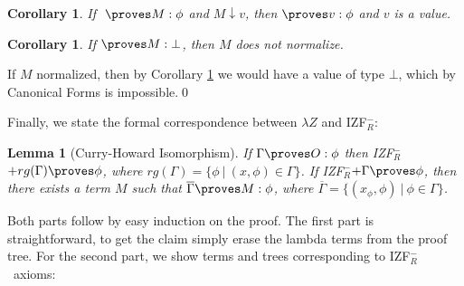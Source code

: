 \documentclass{LMCS}
\newtheorem{corollary}[thm]{Corollary}
\newtheorem{lemma}[thm]{Lemma}
\newcommand{\ov}[1]{\ensuremath{\overline{#1}}}
\newcommand{\p}{\proves}
\newcommand{\g}{\Gamma}
\newcommand{\gp}{\Gamma \proves}
\newcommand{\og}{\ov{\g}}
\newcommand{\iizfr}{IZF${}_R^{-}$}
\newcommand{\lz}{\lambda Z}
\begin{document}
\begin{corollary}\label{corlz}
If $\ \p M : \phi$ and $M \downarrow v$, then $\p v : \phi$ and $v$ is a value.
\end{corollary}

\begin{corollary}\label{corbot}
If $\p M : \bot$, then $M$ does not normalize.
\end{corollary}
\proof If $M$ normalized, then by Corollary \ref{corlz} we would have a value of
type $\bot$, which by Canonical Forms is impossible.\qed


Finally, we state the formal correspondence between $\lz$ and \iizfr:

\begin{lemma}[Curry-Howard Isomorphism]\label{ch}
If $\gp  O : \phi$ then \iizfr $ + rg(\g) \p  \phi$, where $rg(\g) = \{
\phi\ |\ (x, \phi) \in \g \}$. If \iizfr $+ \g \p \phi$, then there exists a term $M$ such that $\og \p M :
\phi$, where $\og = \{ (x_\phi, \phi)\ |\ \phi \in \g \}$.
\end{lemma}
\proof Both parts follow by easy induction on the proof. The first part is
straightforward, to get the claim simply erase the lambda terms from the
proof tree. For the second part, we show terms and trees corresponding to \iizfr\ axioms:
\end{document}
